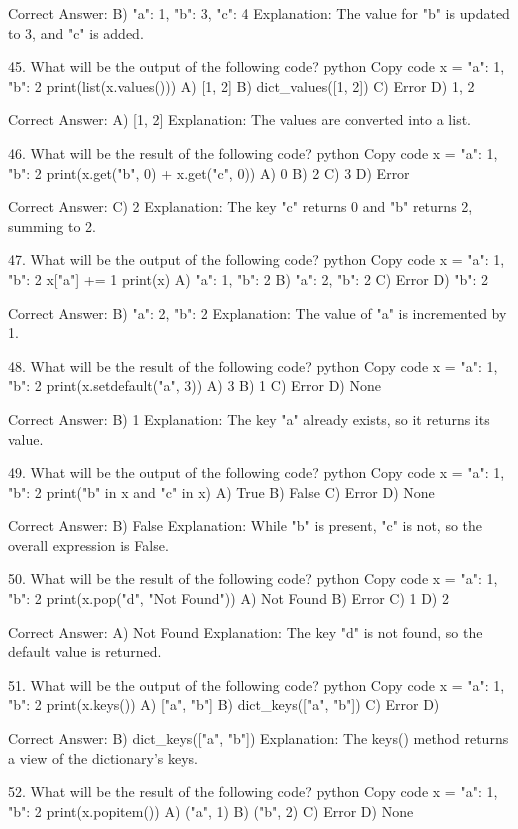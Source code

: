 Correct Answer: B) {"a": 1, "b": 3, "c": 4}
Explanation: The value for "b" is updated to 3, and "c" is added.

45. What will be the output of the following code?
python
Copy code
x = {"a": 1, "b": 2}
print(list(x.values()))
A) [1, 2]
B) dict_values([1, 2])
C) Error
D) {1, 2}

Correct Answer: A) [1, 2]
Explanation: The values are converted into a list.

46. What will be the result of the following code?
python
Copy code
x = {"a": 1, "b": 2}
print(x.get("b", 0) + x.get("c", 0))
A) 0
B) 2
C) 3
D) Error

Correct Answer: C) 2
Explanation: The key "c" returns 0 and "b" returns 2, summing to 2.

47. What will be the output of the following code?
python
Copy code
x = {"a": 1, "b": 2}
x["a"] += 1
print(x)
A) {"a": 1, "b": 2}
B) {"a": 2, "b": 2}
C) Error
D) {"b": 2}

Correct Answer: B) {"a": 2, "b": 2}
Explanation: The value of "a" is incremented by 1.

48. What will be the result of the following code?
python
Copy code
x = {"a": 1, "b": 2}
print(x.setdefault("a", 3))
A) 3
B) 1
C) Error
D) None

Correct Answer: B) 1
Explanation: The key "a" already exists, so it returns its value.

49. What will be the output of the following code?
python
Copy code
x = {"a": 1, "b": 2}
print("b" in x and "c" in x)
A) True
B) False
C) Error
D) None

Correct Answer: B) False
Explanation: While "b" is present, "c" is not, so the overall expression is False.

50. What will be the result of the following code?
python
Copy code
x = {"a": 1, "b": 2}
print(x.pop("d", "Not Found"))
A) Not Found
B) Error
C) 1
D) 2

Correct Answer: A) Not Found
Explanation: The key "d" is not found, so the default value is returned.

51. What will be the output of the following code?
python
Copy code
x = {"a": 1, "b": 2}
print(x.keys())
A) ["a", "b"]
B) dict_keys(["a", "b"])
C) Error
D) {}

Correct Answer: B) dict_keys(["a", "b"])
Explanation: The keys() method returns a view of the dictionary's keys.

52. What will be the result of the following code?
python
Copy code
x = {"a": 1, "b": 2}
print(x.popitem())
A) ("a", 1)
B) ("b", 2)
C) Error
D) None

